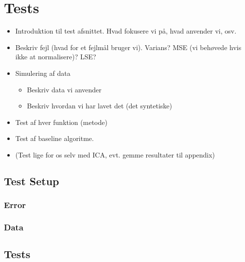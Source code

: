 \section{Tests}
    \begin{itemize}
        \item Introduktion til test afsnittet. Hvad fokusere vi på, hvad anvender vi, osv.
        \item Beskriv fejl (hvad for et fejlmål bruger vi). Varians? MSE (vi behøvede hvis ikke at normalisere)? LSE?
        \item Simulering af data
        \begin{itemize}
            \item Beskriv data vi anvender
            \item Beskriv hvordan vi har lavet det (det syntetiske)
        \end{itemize}
        \item Test af hver funktion (metode)
        \item Test af baseline algoritme.
        \item (Test lige for os selv med ICA, evt. gemme resultater til appendix)
    \end{itemize}
    
\subsection{Test Setup}

\subsubsection{Error}

\subsubsection{Data}

\subsection{Tests}